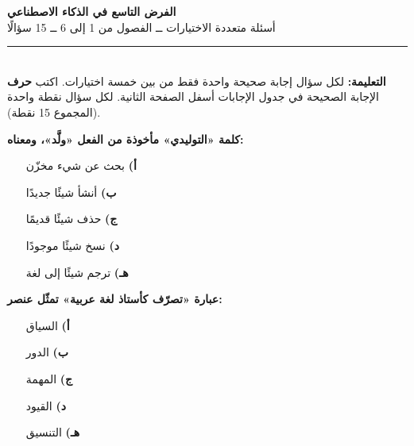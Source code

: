 \documentclass[11pt,a4paper]{article}
\begin{document}
\begin{center}
{\Large\khatt\textbf{الفرض التاسع في الذكاء الاصطناعي}}\\[2pt]
{\normalsize أسئلة متعددة الاختيارات ــ الفصول من 1 إلى 6 ــ 15 سؤالًا}
\end{center}
\vspace{-4pt}\rule{\textwidth}{0.6pt}\\
{\small\textbf{التعليمة:} لكل سؤال إجابة صحيحة واحدة فقط من بين خمسة اختيارات.
اكتب \textbf{حرف} الإجابة الصحيحة في جدول الإجابات أسفل الصفحة الثانية.
لكل سؤال نقطة واحدة (المجموع 15 نقطة).}
\vspace{-2pt}
\begin{multicols}{2}

\noindent\begin{minipage}{\linewidth}
\hangindent=0.7cm\textbf{كلمة «التوليدي» مأخوذة من الفعل «ولَّد»، ومعناه:}
\begin{itemize}[leftmargin=0.95cm, labelsep=4pt, itemsep=0pt, topsep=2pt, parsep=0pt]
  \item[\textbf{أ)}] بحث عن شيء مخزّن
  \item[\textbf{ب)}] أنشأ شيئًا جديدًا
  \item[\textbf{ج)}] حذف شيئًا قديمًا
  \item[\textbf{د)}] نسخ شيئًا موجودًا
  \item[\textbf{هـ)}] ترجم شيئًا إلى لغة
\end{itemize}
\end{minipage}\par\vspace{7pt plus 4pt}
\noindent\begin{minipage}{\linewidth}
\hangindent=0.7cm\textbf{عبارة «تصرّف كأستاذ لغة عربية» تمثّل عنصر:}
\begin{itemize}[leftmargin=0.95cm, labelsep=4pt, itemsep=0pt, topsep=2pt, parsep=0pt]
  \item[\textbf{أ)}] السياق
  \item[\textbf{ب)}] الدور
  \item[\textbf{ج)}] المهمة
  \item[\textbf{د)}] القيود
  \item[\textbf{هـ)}] التنسيق
\end{itemize}
\end{minipage}\par\vspace{7pt plus 4pt}
\noindent\begin{minipage}{\linewidth}

\end{minipage}
\end{multicols}
\end{document}
